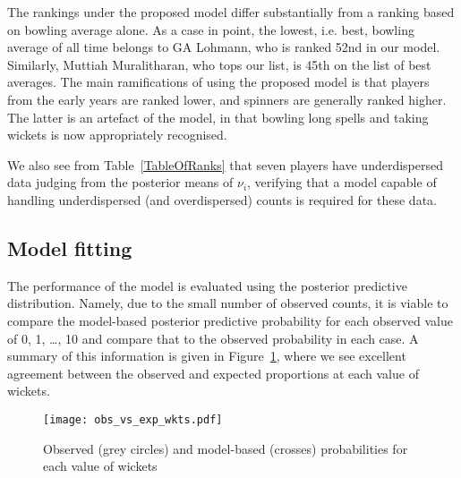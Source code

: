 \documentclass{statsoc}
\newcommand{\pmp}[1]{\textcolor{blue}{#1}}
\begin{document}
The rankings under the proposed model differ substantially from a ranking based on bowling average alone. As a case in point, the lowest, i.e. best, bowling average of all time belongs to GA Lohmann, who is ranked 52nd in our model. Similarly, Muttiah Muralitharan, who tops our list, is 45th on the list of best averages. The main ramifications of using the proposed model is that players from the early years are ranked lower, and spinners are generally ranked higher. The latter is an artefact of the model, in that bowling long spells and taking wickets is now appropriately recognised.

We also see from Table~\ref{TableOfRanks} that seven players have underdispersed data judging from the posterior means of $\nu_i$, verifying that a model capable of handling underdispersed (and overdispersed) counts is required for these data.



\subsection{Model fitting}
The performance of the model is evaluated using the posterior predictive distribution. Namely, due to the small number of observed counts, it is viable to compare the model-based posterior predictive probability for each observed value of 0, 1, \ldots, 10 and compare that to the observed probability in each case. A summary of this information is given in Figure~\ref{OvE_summary}, where we see excellent agreement between the observed and expected proportions at each value of wickets.

\begin{figure}[H]
    \centering
    \texttt{[image: obs\_vs\_exp\_wkts.pdf]}
    \caption{Observed (grey circles) and model-based (crosses) probabilities for each value of wickets}
    \label{OvE_summary}
\end{figure}

\end{document}
